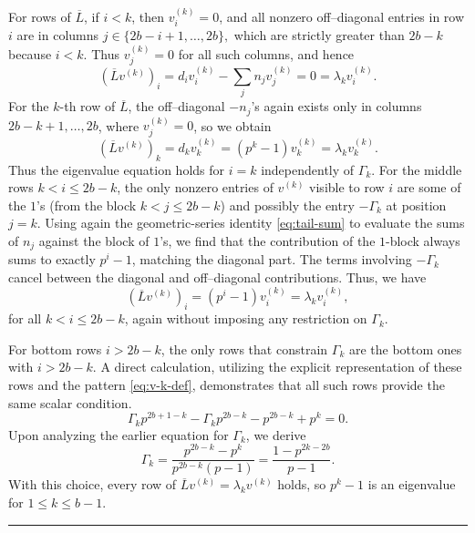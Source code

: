 \documentclass[12pt,twoside]{article}
\renewenvironment{proof}{{\noindent\bfseries Proof.}}{\qed}
\def\qed{\nolinebreak\hfill\rule{.2cm}{.2cm}\par\addvspace{.5cm}}
\begin{document}
\begin{proof}
	
	For rows of $\overline{L}$, if $i<k$, then $v^{(k)}_i=0$, and all nonzero off–diagonal entries in row $i$ are in columns $	j\in\{2b-i+1,\dots,2b\},$	which are strictly greater than $2b-k$ because $i<k$. Thus $v^{(k)}_j=0$ for all such columns, and hence
	\[
	(\overline{L}v^{(k)})_i
	= d_i v^{(k)}_i - \sum_j n_j v^{(k)}_j = 0
	= \lambda_k v^{(k)}_i.
	\]
	For the $k$-th row of $\overline{L}$, the off–diagonal $-n_j$'s again exists only in columns $2b-k+1,\dots,2b$, where $v^{(k)}_j=0$, so we obtain
	\[
	(\overline{L}v^{(k)})_k = d_k v^{(k)}_k = (p^k-1) v^{(k)}_k
	= \lambda_k v^{(k)}_k.
	\]
	Thus the eigenvalue equation holds for $i=k$ independently of $ \varGamma_k$.
	For the middle rows $k<i\le 2b-k$, the only nonzero entries of $v^{(k)}$ visible to row $i$ are some of the $1$'s (from the block $k<j\le 2b-k$) and possibly the entry $- \varGamma_k$ at position $j=k$.	Using again the geometric-series identity \eqref{eq:tail-sum} to evaluate the sums of $n_j$ against the block of $1$'s, we find  that the contribution of the $1$-block always sums to exactly $p^{i}-1$, matching the diagonal part. The terms involving $- \varGamma_k$ cancel between the diagonal and off–diagonal contributions. Thus, we have
	\[
	(\overline{L}v^{(k)})_i = (p^{i}-1)v^{(k)}_i = \lambda_k v^{(k)}_i,
	\]
	for all $k<i\le 2b-k$, again without imposing any restriction on $ \varGamma_k$.
	
	For bottom rows $i>2b-k$, the only rows that constrain $ \varGamma_k$ are the bottom ones with $i>2b-k$. 
	A direct calculation, utilizing the explicit representation of these rows and the pattern \eqref{eq:v-k-def}, demonstrates that all such rows provide the same scalar condition.
	\[
	 \varGamma_k p^{ 2b+1-k} -  \varGamma_k p^{ 2b-k} - p^{ 2b-k} + p^{ k} = 0.
	\]
	Upon analyzing the earlier equation for $ \varGamma_k$, we derive
	\begin{equation}\label{eq:gamma-k-small}
		 \varGamma_k = \frac{p^{2b-k}-p^k}{p^{2b-k}(p-1)} = \frac{1-p^{2k-2b}}{p-1}.
	\end{equation}
	With this choice, every row of $\overline{L}v^{(k)}=\lambda_k v^{(k)}$ holds, so $p^k-1$ is an eigenvalue for $1\le k\le b-1$.
	
	\medskip
	

\end{proof}
\end{document}
